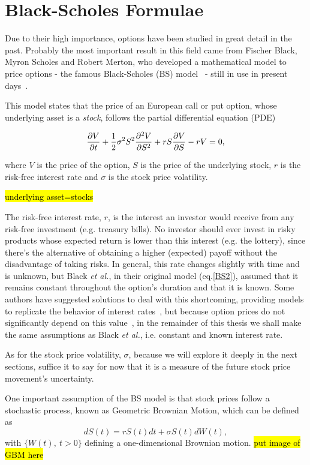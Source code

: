     
\section{Black-Scholes Formulae}
\label{section:Black-Scholes Formulae}
Due to their high importance, options have been studied in great detail in the past.
Probably the most important result in this field came from Fischer Black, Myron Scholes and Robert Merton, who developed a mathematical model to price options - the famous Black-Scholes (BS) model~\cite{Scholes} - still in use in present days~\cite{Wilmott3}.

This model states that the price of an European call or put option, whose underlying asset is a \emph{stock}, follows the partial differential equation (PDE)

\begin{equation}\label{BS2}
\pdv{V}{t}+\frac{1}{2}\sigma^2S^2\pdv{^2V}{S^2}+rS\pdv{V}{S}-rV=0,
\end{equation}

\noindent where $V$ is the price of the option, $S$ is the price of the underlying stock, $r$ is the risk-free interest rate and $\sigma$ is the stock price volatility.

\hl{underlying asset=stocks}
 
The risk-free interest rate, $r$, is the interest an investor would receive from any risk-free investment (e.g. treasury bills). No investor should ever invest in risky products whose expected return is lower than this interest (e.g. the lottery), since there's the alternative of obtaining a higher (expected) payoff without the disadvantage of taking risks. In general, this rate changes slightly with time and is unknown, but Black \textit{et al.}, in their original model (eq.\eqref{BS2}), assumed that it remains constant throughout the option's duration and that it is known. Some authors have suggested solutions to deal with this shortcoming, providing models to replicate the behavior of interest rates~\cite{HJM}, but because option prices do not significantly depend on this value~\cite{Wilmott3}, in the remainder of this thesis we shall make the same assumptions as Black \textit{et al.}, i.e. constant and known interest rate.

As for the stock price volatility, $\sigma$, because we will explore it deeply in the next sections, suffice it to say for now that it is a measure of the future stock price movement's uncertainty.

One important assumption of the BS model is that stock prices follow a stochastic process, known as Geometric Brownian Motion, which can be defined as
\begin{equation}\label{GBM}
dS(t)=rS(t)dt+\sigma S(t)dW(t),
\end{equation}
\noindent with $\{W(t),\ t>0\}$ defining a one-dimensional Brownian motion.
\hl{put image of GBM here}

